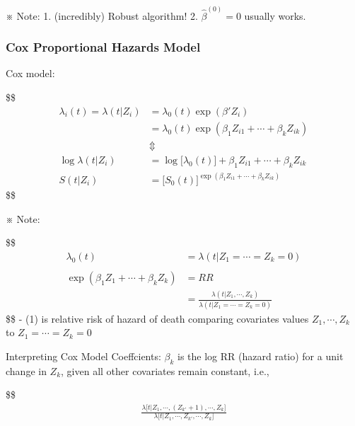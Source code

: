 \documentclass[
]{book}
\begin{document}
{{{※ Note:
1. (incredibly) Robust algorithm!
2. \(\hat \beta^{(0)} = 0\) usually works.

\hypertarget{cox-proportional-hazards-model}{%
\subsubsection{Cox Proportional Hazards Model}\label{cox-proportional-hazards-model}}

Cox model:

\$\$
\begin{align}

\lambda_i(t) = \lambda(t \Big | Z_i ) 
&= \lambda_0 (t) \exp(\beta ' Z_i) 
\\
&= \lambda_0(t) \exp(\beta_1 Z_{i1} + \cdots + \beta_k Z_{ik})
\\
&\Updownarrow
\\

\log \lambda(t \Big | Z_i ) &= \log \Big[ \lambda_0(t) \Big] +\beta_1 Z_{i1} + \cdots + \beta_k Z_{ik}
\\
S(t \Big | Z_i ) &= 



\Big[ S_0(t) \Big]^{\exp(\beta_1 Z_{i1} + \cdots + \beta_k Z_{ik})}


\end{align}
\$\$

※ Note:

\$\$
\begin{align}
\lambda_0 (t) &= \lambda(t \Big | Z_1 = \cdots = Z_k = 0)
\\
\\
\exp(\beta_1 Z_{1} + \cdots + \beta_k Z_{k}) &= RR 



\\
&= \frac{\lambda(t \Big | Z_1 , \cdots, Z_k)}{\lambda(t \Big | Z_1 = \cdots = Z_k = 0)} \tag{1}
\end{align}
\$\$
- (1) is relative risk of hazard of death comparing covariates values \(Z_1,\cdots, Z_k\) to \(Z_1 = \cdots = Z_k = 0\)

Interpreting Cox Model Coeffcients: \(\beta_k\) is the log RR (hazard ratio) for a unit change in \(Z_k\), given all other covariates remain constant, i.e.,

\$\$
\begin{align}


\frac
{\lambda\Big[t \Big | Z_1 , \cdots, (Z_{k'}+1), \cdots, Z_k \Big]}
{\lambda\Big[t \Big | Z_1 , \cdots, Z_{k'}, \cdots, Z_k \Big]} 



\end{align}}}}
\end{document}
